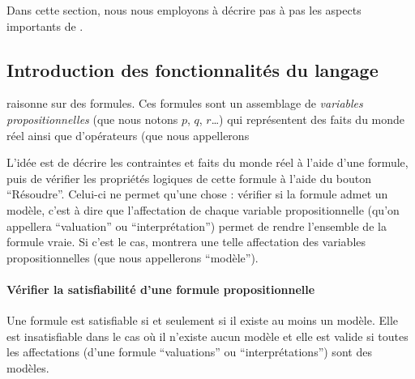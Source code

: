 

Dans cette section, nous nous employons à décrire pas à pas les aspects importants de \touist.

\subsection{Introduction des fonctionnalités du langage \touist}

\touist raisonne sur des formules. Ces formules sont un assemblage de \emph{variables propositionnelles} (que nous notons $p$, $q$, $r$\dots) qui représentent des faits du monde réel ainsi que d'opérateurs (que nous appellerons %

L'idée est de décrire les contraintes et faits du monde réel à l'aide d'une formule, puis de vérifier les propriétés logiques de cette formule à l'aide du bouton \enquote{Résoudre}. Celui-ci ne permet qu'une chose : vérifier si la formule admet un modèle, c'est à dire que l'affectation de chaque variable propositionnelle (qu'on appellera \enquote{valuation} ou \enquote{interprétation}) permet de rendre l'ensemble de la formule vraie. Si c'est le cas, \touist montrera une telle affectation des variables propositionnelles (que nous appellerons \enquote{modèle}).

\paragraph{Vérifier la satisfiabilité d'une formule propositionnelle} Une formule est satisfiable si et seulement si il existe au moins un modèle. Elle est insatisfiable dans le cas où il n'existe aucun modèle et elle est valide si toutes les affectations (d'une formule \enquote{valuations} ou \enquote{interprétations}) sont des modèles.

